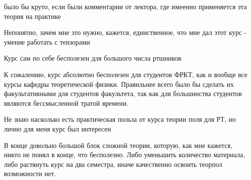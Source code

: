         \begin{commentbox}
            было бы круто, если были комментарии от лектора, где имеенно применяется эта теория на практике
        \end{commentbox}

        \begin{commentbox}
            Непонятно, зачем мне это нужно, кажется, единственное, что мне дал этот курс - умение работать с тензорами
        \end{commentbox}

        \begin{commentbox}
            Курс сам по себе бесполезен для большого числа ртшников
        \end{commentbox}

        \begin{commentbox}
            К сожалению, курс абсолютно бесполезен для студентов ФРКТ, как и вообще все курсы кафедры теоретической физики. Правильнее всего было бы сделать их факультативными для студентов факультета, так как для большинства студентов являются бессмысленной тратой времени.
        \end{commentbox}

        \begin{commentbox}
            Не знаю насколько есть практическая польза от курса теории поля для РТ, но лично для меня курс был интересен
        \end{commentbox}

        \begin{commentbox}
            В конце довольно большой блок сложной теории, которую,  как мне кажется, никто не понял в конце, что бесполезно. Либо уменьшить количество материала, либо растянуть курс на два семестра, иначе качественно освоить теорпол возможности нет.
        \end{commentbox}

